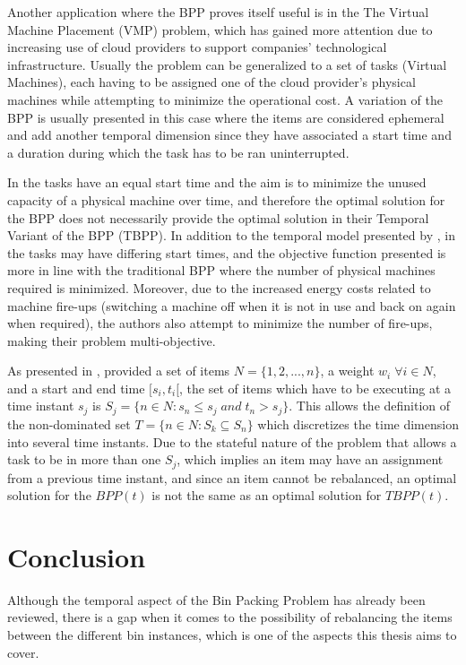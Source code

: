 Another application where the BPP proves itself useful is in the The Virtual
Machine Placement (VMP) problem, which has gained more attention due to
increasing use of cloud providers to support companies' technological
infrastructure. Usually the problem can be generalized to a set of tasks
(Virtual Machines), each having to be assigned one of the cloud provider's
physical machines while attempting to minimize the operational cost. A variation
of the BPP is usually presented in this case where the items are considered
ephemeral and add another temporal dimension since they have associated a start
time and a duration during which the task has to be ran uninterrupted. 

In \cite{de2016temporal} the tasks have an equal start time and the aim is to
minimize the unused capacity of a physical machine over time, and therefore the
optimal solution for the BPP does not necessarily provide the optimal solution
in their Temporal Variant of the BPP (TBPP). In addition to the temporal model
presented by \cite{de2016temporal}, in \cite{aydin2020multi} the tasks may have
differing start times, and the objective function presented is more in line with
the traditional BPP where the number of physical machines required is minimized.
Moreover, due to the increased energy costs related to machine fire-ups
(switching a machine off when it is not in use and back on again when required),
the authors also attempt to minimize the number of fire-ups, making their
problem multi-objective.

As presented in \cite{furini2018matheuristics}, provided a set of items $N =
\{1,2,...,n\}$, a weight $w_i \; \forall i \in N$, and a start and end time
$[s_i, t_i[$, the set of items which have to be executing at a time instant
$s_j$ is $S_j = \{n \in N: s_n \leq s_j \; and \; t_n > s_j\}$. This allows the
definition of the non-dominated set $T = \{n \in N: S_k \subseteq S_n\}$ which
discretizes the time dimension into several time instants. Due to the stateful
nature of the problem that allows a task to be in more than one $S_j$, which
implies an item may have an assignment from a previous time instant, and since
an item cannot be rebalanced, an optimal solution for the $BPP(t)$ is not the
same as an optimal solution for $TBPP(t)$.

\section{Conclusion}

Although the temporal aspect of the Bin Packing Problem has already been
reviewed, there is a gap when it comes to the possibility of rebalancing the
items between the different bin instances, which is one of the aspects this
thesis aims to cover. 


